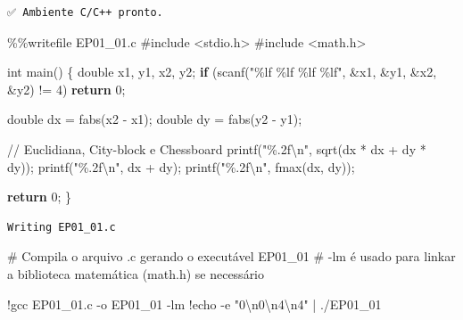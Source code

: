 \documentclass[
  portuguese,
  letterpaper,
  openany,
  oneside,
  12pt,
  a4paper]{book}
\newenvironment{Shaded}{\begin{snugshade}}{\end{snugshade}}
\newcommand{\BuiltInTok}[1]{\textcolor[rgb]{0.00,0.23,0.31}{#1}}
\newcommand{\CharTok}[1]{\textcolor[rgb]{0.13,0.47,0.30}{#1}}
\newcommand{\CommentTok}[1]{\textcolor[rgb]{0.37,0.37,0.37}{#1}}
\newcommand{\ControlFlowTok}[1]{\textcolor[rgb]{0.00,0.23,0.31}{\textbf{#1}}}
\newcommand{\DecValTok}[1]{\textcolor[rgb]{0.68,0.00,0.00}{#1}}
\newcommand{\NormalTok}[1]{\textcolor[rgb]{0.00,0.23,0.31}{#1}}
\newcommand{\OperatorTok}[1]{\textcolor[rgb]{0.37,0.37,0.37}{#1}}
\newcommand{\SpecialCharTok}[1]{\textcolor[rgb]{0.37,0.37,0.37}{#1}}
\newcommand{\StringTok}[1]{\textcolor[rgb]{0.13,0.47,0.30}{#1}}
\begin{document}
\begin{verbatim}
✅ Ambiente C/C++ pronto.
\end{verbatim}

\begin{Shaded}
\begin{Highlighting}[]
\OperatorTok{\%\%}\NormalTok{writefile EP01\_01.c}
\CommentTok{\#include \textless{}stdio.h\textgreater{}}
\CommentTok{\#include \textless{}math.h\textgreater{}}

\BuiltInTok{int}\NormalTok{ main() \{}
\NormalTok{    double x1, y1, x2, y2}\OperatorTok{;}
    \ControlFlowTok{if}\NormalTok{ (scanf(}\StringTok{"}\SpecialCharTok{\%lf}\StringTok{ }\SpecialCharTok{\%lf}\StringTok{ }\SpecialCharTok{\%lf}\StringTok{ }\SpecialCharTok{\%lf}\StringTok{"}\NormalTok{, }\OperatorTok{\&}\NormalTok{x1, }\OperatorTok{\&}\NormalTok{y1, }\OperatorTok{\&}\NormalTok{x2, }\OperatorTok{\&}\NormalTok{y2) }\OperatorTok{!=} \DecValTok{4}\NormalTok{) }\ControlFlowTok{return} \DecValTok{0}\OperatorTok{;}

\NormalTok{    double dx }\OperatorTok{=}\NormalTok{ fabs(x2 }\OperatorTok{{-}}\NormalTok{ x1)}\OperatorTok{;}
\NormalTok{    double dy }\OperatorTok{=}\NormalTok{ fabs(y2 }\OperatorTok{{-}}\NormalTok{ y1)}\OperatorTok{;}

    \OperatorTok{//}\NormalTok{ Euclidiana, City}\OperatorTok{{-}}\NormalTok{block e Chessboard}
\NormalTok{    printf(}\StringTok{"}\SpecialCharTok{\%.2f}\CharTok{\textbackslash{}n}\StringTok{"}\NormalTok{, sqrt(dx }\OperatorTok{*}\NormalTok{ dx }\OperatorTok{+}\NormalTok{ dy }\OperatorTok{*}\NormalTok{ dy))}\OperatorTok{;}
\NormalTok{    printf(}\StringTok{"}\SpecialCharTok{\%.2f}\CharTok{\textbackslash{}n}\StringTok{"}\NormalTok{, dx }\OperatorTok{+}\NormalTok{ dy)}\OperatorTok{;}
\NormalTok{    printf(}\StringTok{"}\SpecialCharTok{\%.2f}\CharTok{\textbackslash{}n}\StringTok{"}\NormalTok{, fmax(dx, dy))}\OperatorTok{;}

    \ControlFlowTok{return} \DecValTok{0}\OperatorTok{;}
\NormalTok{\}}
\end{Highlighting}
\end{Shaded}

\begin{verbatim}
Writing EP01_01.c
\end{verbatim}

\begin{Shaded}
\begin{Highlighting}[]
\CommentTok{\# Compila o arquivo .c gerando o executável EP01\_01}
\CommentTok{\# {-}lm é usado para linkar a biblioteca matemática (math.h) se necessário}

\OperatorTok{!}\NormalTok{gcc EP01\_01.c }\OperatorTok{{-}}\NormalTok{o EP01\_01 }\OperatorTok{{-}}\NormalTok{lm}
\OperatorTok{!}\NormalTok{echo }\OperatorTok{{-}}\NormalTok{e }\StringTok{"0}\CharTok{\textbackslash{}n}\StringTok{0}\CharTok{\textbackslash{}n}\StringTok{4}\CharTok{\textbackslash{}n}\StringTok{4"} \OperatorTok{|}\NormalTok{ .}\OperatorTok{/}\NormalTok{EP01\_01}
\end{Highlighting}
\end{Shaded}
\end{document}
